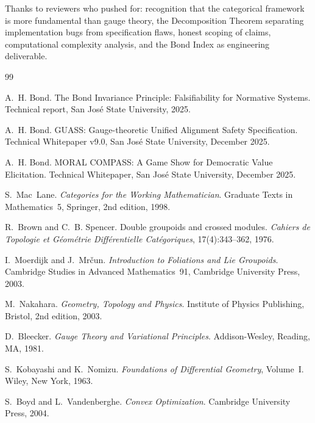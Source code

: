\documentclass[12pt]{article}
\begin{document}
Thanks to reviewers who pushed for: recognition that the categorical framework is more fundamental than gauge theory, the Decomposition Theorem separating implementation bugs from specification flaws, honest scoping of claims, computational complexity analysis, and the Bond Index as engineering deliverable.

\begin{thebibliography}{99}

A.~H. Bond.
\newblock The Bond Invariance Principle: Falsifiability for Normative Systems.
\newblock Technical report, San Jos\'{e} State University, 2025.

A.~H. Bond.
\newblock GUASS: Gauge-theoretic Unified Alignment Safety Specification.
\newblock Technical Whitepaper v9.0, San Jos\'{e} State University, December 2025.

A.~H. Bond.
\newblock MORAL COMPASS: A Game Show for Democratic Value Elicitation.
\newblock Technical Whitepaper, San Jos\'{e} State University, December 2025.

S.~Mac~Lane.
\newblock \emph{Categories for the Working Mathematician}.
\newblock Graduate Texts in Mathematics~5, Springer, 2nd edition, 1998.

R.~Brown and C.~B. Spencer.
\newblock Double groupoids and crossed modules.
\newblock \emph{Cahiers de Topologie et G\'{e}om\'{e}trie Diff\'{e}rentielle Cat\'{e}goriques}, 17(4):343--362, 1976.

I.~Moerdijk and J.~Mr\v{c}un.
\newblock \emph{Introduction to Foliations and Lie Groupoids}.
\newblock Cambridge Studies in Advanced Mathematics~91, Cambridge University Press, 2003.

M.~Nakahara.
\newblock \emph{Geometry, Topology and Physics}.
\newblock Institute of Physics Publishing, Bristol, 2nd edition, 2003.

D.~Bleecker.
\newblock \emph{Gauge Theory and Variational Principles}.
\newblock Addison-Wesley, Reading, MA, 1981.

S.~Kobayashi and K.~Nomizu.
\newblock \emph{Foundations of Differential Geometry}, Volume~I.
\newblock Wiley, New York, 1963.

S.~Boyd and L.~Vandenberghe.
\newblock \emph{Convex Optimization}.
\newblock Cambridge University Press, 2004.


\end{thebibliography}
\end{document}
